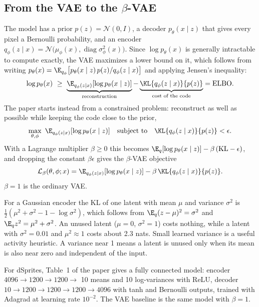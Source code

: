 \subsection{From the VAE to the \texorpdfstring{$\beta$}{beta}-VAE}
The model has a prior $p(z)=\mathcal N(0,I)$, a decoder $p_\theta(x\mid z)$ that gives every pixel a Bernoulli probability, and an encoder $q_\phi(z\mid x)=\mathcal N\big(\mu_\phi(x),\operatorname{diag}\sigma^2_\phi(x)\big)$. Since $\log p_\theta(x)$ is generally intractable to compute exactly, the VAE maximizes a lower bound on it, which follows from writing $p_\theta(x)=\E_{q_\phi}\big[p_\theta(x\mid z)\,p(z)/q_\phi(z\mid x)\big]$ and applying Jensen's inequality:
\[
  \log p_\theta(x)\ \ge\ \underbrace{\E_{q_\phi(z\mid x)}[\log p_\theta(x\mid z)]}_{\text{reconstruction}}-\underbrace{\KL{q_\phi(z\mid x)}{p(z)}}_{\text{cost of the code}}=\text{ELBO}.
\]
The paper starts instead from a constrained problem: reconstruct as well as possible while keeping the code close to the prior,
\[
  \max_{\theta,\phi}\ \E_{q_\phi(z\mid x)}[\log p_\theta(x\mid z)]\quad\text{subject to}\quad \KL{q_\phi(z\mid x)}{p(z)}<\epsilon .
\]
With a Lagrange multiplier $\beta\ge0$ this becomes $\E_q[\log p_\theta(x\mid z)]-\beta\,(\mathrm{KL}-\epsilon)$, and dropping the constant $\beta\epsilon$ gives the $\beta$-VAE objective
\[
  \mathcal L_\beta(\theta,\phi;x)=\E_{q_\phi(z\mid x)}[\log p_\theta(x\mid z)]-\beta\,\KL{q_\phi(z\mid x)}{p(z)} .
\]
$\beta=1$ is the ordinary VAE.

For a Gaussian encoder the KL of one latent with mean $\mu$ and variance $\sigma^2$ is $\tfrac12(\mu^2+\sigma^2-1-\log\sigma^2)$, which follows from $\E_q(z-\mu)^2=\sigma^2$ and $\E_q z^2=\mu^2+\sigma^2$. An unused latent ($\mu=0$, $\sigma^2=1$) costs nothing, while a latent with $\sigma^2=0.01$ and $\mu^2\approx1$ costs about 2.3 nats. Small learned variance is a useful activity heuristic. A variance near 1 means a latent is unused only when its mean is also near zero and independent of the input.

For dSprites, Table~1 of the paper gives a fully connected model: encoder $4096\to1200\to1200\to$ 10 means and 10 log-variances with ReLU, decoder $10\to1200\to1200\to1200\to4096$ with tanh and Bernoulli outputs, trained with Adagrad at learning rate $10^{-2}$. The VAE baseline is the same model with $\beta=1$.

